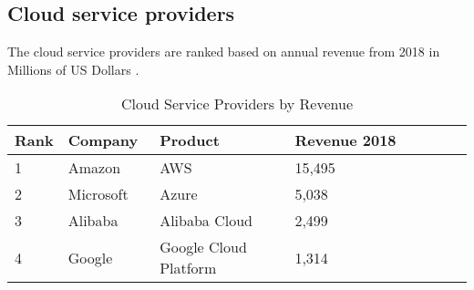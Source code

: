 \subsection{Cloud service providers}
The cloud service providers are ranked based on annual revenue from 2018 in Millions of US Dollars \parencite{iaasrevenue}.
\begin{table}
\caption{Cloud Service Providers by Revenue}
\begin{center}
\begin{tabular}{ | p{0.1\linewidth} | p{0.2\linewidth} | p{0.3\linewidth} | p{0.4\linewidth} |} 
\hline
\textbf{Rank} & \textbf{Company} & \textbf{Product} & \textbf{Revenue 2018} \\ 
\hline
1 & Amazon & AWS & 15,495\\
\hline
2 & Microsoft & Azure & 5,038 \\
\hline
3 & Alibaba & Alibaba Cloud & 2,499 \\
\hline
4 & Google & Google Cloud Platform & 1,314\\
\hline
\end{tabular}
\end{center}
\end{table}